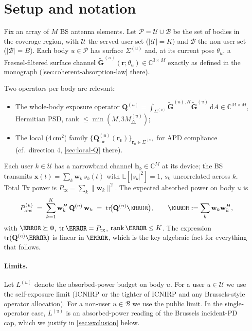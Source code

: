 \documentclass[11pt,a4paper]{article}
\theoremstyle{definition}
\newcommand{\rr}{\mathbf{r}}
\newcommand{\xx}{\mathbf{x}}
\newcommand{\ww}{\mathbf{w}}
\newcommand{\hh}{\mathbf{h}}
\newcommand{\zero}{\mathbf{0}}
\newcommand{\Pabs}{P_{\mathrm{abs}}}
\newcommand{\Ptx}{P_{\mathrm{tx}}}
\newcommand{\Q}{\mathbf{Q}}
\newcommand{\Gtil}{\tilde{\mathbf{G}}}
\newcommand{\diff}{\mathrm{d}}
\DeclareMathOperator{\tr}{tr}
\DeclareMathOperator{\rank}{rank}
\newcommand{\Complex}{\mathbb{C}}
\newcommand{\Users}{\mathcal{U}}
\newcommand{\NonUsers}{\mathcal{B}}
\newcommand{\Bodies}{\mathcal{P}}
\begin{document}
\section{Setup and notation}\label{sec:setup}

Fix an array of $M$ BS antenna elements. Let $\Bodies=\Users\cup\NonUsers$
be the set of bodies in the coverage region, with $\Users$ the served
user set ($|\Users|=K$) and $\NonUsers$ the non-user set
($|\NonUsers|=B$). Each body $u\in\Bodies$ has surface $\Sigma^{(u)}$
and, at its current pose $\theta_u$, a Fresnel-filtered surface
channel $\Gtil^{(u)}(\rr;\theta_u)\in\Complex^{3\times M}$ exactly as
defined in the monograph (\cref{sec:coherent-absorption-law} there).

Two operators per body are relevant:

\begin{itemize}[leftmargin=1.6em,itemsep=2pt]
\item The whole-body exposure operator
$\Q^{(u)}=\int_{\Sigma^{(u)}}\Gtil^{(u),H}\Gtil^{(u)}\,\diff A
 \in\Complex^{M\times M}$, Hermitian PSD, rank $\le\min(M,3M_\triangle^{(u)})$;
\item The local (4\,cm$^2$) family $\{\Q^{(u)}_{\mathrm{loc}}(\rr_0)\}_{\rr_0\in\Sigma^{(u)}}$
for APD compliance (cf.~direction 4, \cref{sec:local-Q} there).
\end{itemize}

Each user $k\in\Users$ has a narrowband channel
$\hh_k\in\Complex^M$ at its device; the BS transmits
$\xx(t)=\sum_k\ww_k\,s_k(t)$ with
$\mathbb{E}[|s_k|^2]=1$, $s_k$ uncorrelated across $k$. Total Tx
power is $\Ptx=\sum_k\|\ww_k\|^2$. The expected absorbed power on
body $u$ is
\begin{equation}\label{eq:Pabs-u}
  \Pabs^{(u)}
  \;=\;\sum_{k=1}^K \ww_k^H\,\Q^{(u)}\,\ww_k
  \;=\;\tr\!\bigl(\Q^{(u)}\W\bigr),
  \qquad \W:=\sum_k\ww_k\ww_k^H,
\end{equation}
with $\W\succeq\zero$, $\tr\W=\Ptx$, $\rank\W\le K$. The expression
$\tr(\Q^{(u)}\W)$ is linear in $\W$, which is the key algebraic fact
for everything that follows.

\paragraph{Limits.} Let $L^{(u)}$ denote the absorbed-power budget on
body $u$. For a user $u\in\Users$ we use the self-exposure limit
(ICNIRP or the tighter of ICNIRP and any Brussels-style operator
allocation). For a non-user $u\in\NonUsers$ we use the public limit.
In the single-operator case, $L^{(u)}$ is an absorbed-power reading
of the Brussels incident-PD cap, which we justify in
\cref{sec:exclusion} below.
\end{document}
